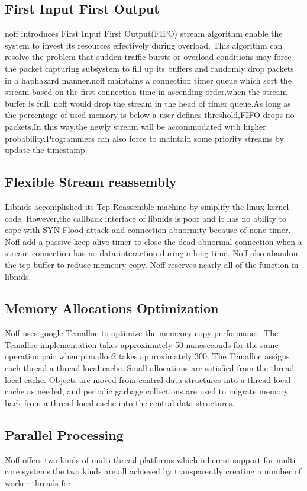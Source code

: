 \documentclass[conference]{IEEEtran}
\begin{document}
\subsection{First Input First Output}
noff introduces First Input First Output(FIFO) stream algorithm enable the system to invest its resources effectively
during overload. This algorithm can resolve the problem that sudden traffic bursts or overload conditions may force the packet
capturing subsystem to fill up its buffers and randomly drop packets in a haphazard manner.noff maintains a connection timer queue which 
sort the stream based on the first connection time in ascending order.when the stream buffer is full. noff would drop the stream in the head of
timer queue.As long as the percentage of used memory is below a user-defines threshold,FIFO drops no packets.In this way,the newly stream will be 
accommodated with higher probability.Programmers can also force to maintain some priority streams by update the timestamp.

\subsection{Flexible Stream reassembly}
Libnids accomplished its Tcp Reassemble machine by simplify the linux kernel code. However,the callback interface of libnids is poor and
it has no ability to cope with SYN Flood attack and connection abnormity because of none timer. Noff add a passive keep-alive timer to close the dead abnormal connection when
a stream connection has no data interaction during a long time. Noff also abandon the tcp buffer to reduce memeory copy. Noff reserves nearly all of the function in libnids.

\subsection{Memory Allocations Optimization}
Noff uses google Tcmalloc to optimize the memeory copy performance. The Tcmalloc implementation takes approximately 50 nanoseconds for the same operation pair when ptmalloc2 takes approximately 300.
The Tcmalloc assigns each thread a thread-local cache. Small allocations are satisfied from the thread-local cache. 
Objects are moved from central data structures into a thread-local cache as needed, and periodic garbage collections are used to migrate memory back from a thread-local cache into the central data structures. 

\subsection{Parallel Processing}
Noff offers two kinds of multi-thread platforms which inherent support for multi-core systems.the two kinds are all
achieved by transparently creating a number of worker threads for
\end{document}
